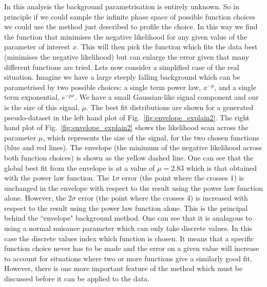 In this analysis the background parametrisation is entirely unknown. So in principle if we could sample the infinite phase space of possible function choices we could use the method just described to profile the choice. In this way we find the function that minimises the negative likelihood for any given value of the parameter of interest $x$. This will then pick the function which fits the data best (minimises the negative likelihood) but can enlarge the error given that many different functions are tried.
Lets now consider a simplified case of the real situation. Imagine we have a large steeply falling background which can be parametrised by two possible choices: a single term power law, $x^{-p}$, and a single term exponential, $e^{-px}$. We have a small Gaussian-like signal component and our \POI is the size of this signal, $\mu$. The best fit distributions are shown for a generated pseudo-dataset in the left hand plot of Fig.~\ref{fig:envelope_explain2}. The right hand plot of Fig.~\ref{fig:envelope_explain2} shows the likelihood scan across the parameter $\mu$, which represents the size of the signal, for the two chosen functions (blue and red lines). The envelope (the minimum of the negative likelihood across both function choices) is shown as the yellow dashed line. One can see that the global best fit from the envelope is at a value of $\mu=2.83$ which is that obtained with the power law function. The $1\sigma$ error (the point where the \NLL crosses 1) is unchanged in the envelope with respect to the result using the power law function alone. However, the $2\sigma$ error (the point where the \NLL crosses 4) is increased with respect to the result using the power law function alone. This is the principal behind the ``envelope" background method. One can see that it is analagous to using a normal nuisance parameter which can only take discrete values. In this case the discrete values index which function is chosen. It means that a specific function choice never has to be made and the error on a given value will increase to account for situations where two or more functions give a similarly good fit. However, there is one more important feature of the method which must be discussed before it can be applied to the data.

